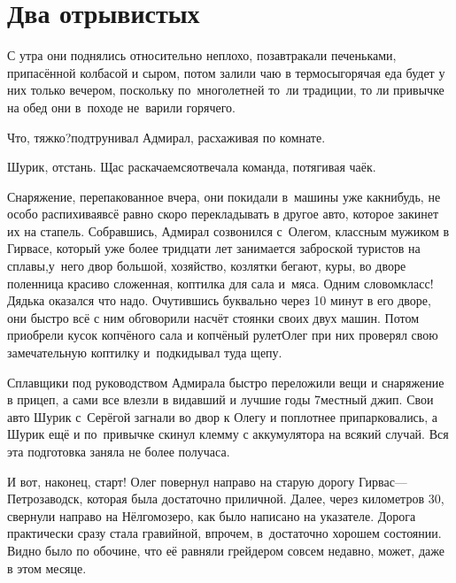 \chapter{Два отрывистых}
\vepsianrose


С утра они поднялись относительно неплохо, позавтракали печеньками, припасённой колбасой и сыром, потом залили чаю в термосы\mdash горячая еда будет у них только вечером, поскольку по~многолетней то~ли традиции, то ли привычке на обед они в~походе не~варили горячего.

\diagdash Что, тяжко?\mdash подтрунивал Адмирал, расхаживая по комнате.

\diagdash Шурик, отстань. Щас раскачаемся\myldots{}\mdash отвечала команда, потягивая чаёк.

Снаряжение, перепакованное вчера, они покидали в~машины уже как\sdash нибудь, не особо распихивая\mdash всё равно скоро перекладывать в другое авто, которое закинет их на стапель. Собравшись, Адмирал созвонился с~Олегом, классным мужиком в Гирвасе, который уже более тридцати лет занимается заброской туристов на сплавы,\mdash у~него двор большой, хозяйство, козлятки бегают, куры, во дворе поленница красиво сложенная, коптилка для сала и~мяса. Одним словом\mdash класс! Дядька оказался что надо. Очутившись буквально через 10 минут в его дворе, они быстро всё с ним обговорили насчёт стоянки своих двух машин. Потом приобрели кусок копчёного сала и копчёный рулет\mdash Олег при них проверял свою замечательную коптилку и~подкидывал туда щепу.

Сплавщики под руководством Адмирала быстро переложили вещи и снаряжение в прицеп, а сами все влезли в видавший и лучшие годы 7\sdash местный джип. Свои авто Шурик с~Серёгой загнали во двор к Олегу и поплотнее припарковались, а Шурик ещё и по~привычке скинул клемму с аккумулятора на всякий случай. Вся эта подготовка заняла не более получаса.

И вот, наконец, старт! Олег повернул направо на старую дорогу Гирвас\thinspace\nobreakdash---\thinspace  Петрозаводск, которая была достаточно приличной. Далее, через километров 30, свернули направо на Нёлгомозеро, как было написано на указателе. Дорога практически сразу стала гравийной, впрочем, в~достаточно хорошем состоянии. Видно было по обочине, что её равняли грейдером совсем недавно, может, даже в этом месяце.

